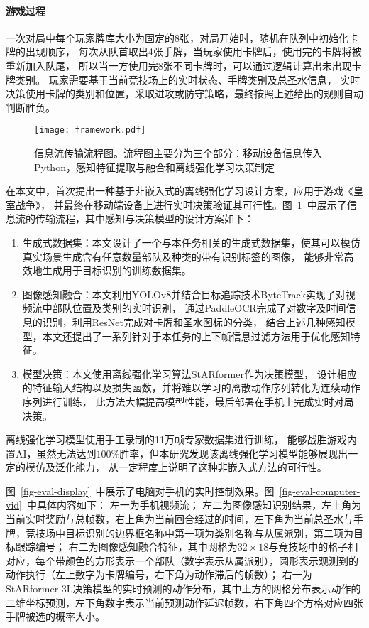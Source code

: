 \paragraph*{游戏过程}一次对局中每个玩家牌库大小为固定的8张，对局开始时，随机在队列中初始化卡牌的出现顺序，
每次从队首取出4张手牌，当玩家使用卡牌后，使用完的卡牌将被重新加入队尾，
所以当一方使用完8张不同卡牌时，可以通过逻辑计算出未出现卡牌类别。
玩家需要基于当前竞技场上的实时状态、手牌类别及总圣水信息，
实时决策使用卡牌的类别和位置，采取进攻或防守策略，最终按照上述给出的规则自动判断胜负。

\begin{figure}[htbp]
  \centering\vspace{-3ex}
  \texttt{[image: framework.pdf]}
  \caption{信息流传输流程图。流程图主要分为三个部分：移动设备信息传入Python，感知特征提取与融合和离线强化学习决策制定}\label{fig-framework}
\end{figure}
在本文中，首次提出一种基于非嵌入式的离线强化学习设计方案，应用于游戏《皇室战争》，
并最终在移动端设备上进行实时决策验证其可行性。图~\ref{fig-framework}~中展示了信息流的传输流程，其中感知与决策模型的设计方案如下：
\begin{enumerate}
  \item 生成式数据集：本文设计了一个与本任务相关的生成式数据集，使其可以模仿真实场景生成含有任意数量部队及种类的带有识别标签的图像，
  能够非常高效地生成用于目标识别的训练数据集。
  \item 图像感知融合：本文利用YOLOv8并结合目标追踪技术ByteTrack实现了对视频流中部队位置及类别的实时识别，
  通过PaddleOCR完成了对数字及时间信息的识别，利用ResNet完成对卡牌和圣水图标的分类，
  结合上述几种感知模型，本文还提出了一系列针对于本任务的上下帧信息过滤方法用于优化感知特征。
  \item 模型决策：本文使用离线强化学习算法StARformer作为决策模型，
  设计相应的特征输入结构以及损失函数，并将难以学习的离散动作序列转化为连续动作序列进行训练，
  此方法大幅提高模型性能，最后部署在手机上完成实时对局决策。
\end{enumerate}

离线强化学习模型使用手工录制的11万帧专家数据集进行训练，
能够战胜游戏内置AI，虽然无法达到$100\%$胜率，但本研究发现该离线强化学习模型能够展现出一定的模仿及泛化能力，
从一定程度上说明了这种非嵌入式方法的可行性。

图~\ref{fig-eval-display}~中展示了电脑对手机的实时控制效果。图~\ref{fig-eval-computer-vid}~中具体内容如下：
左一为手机视频流；
左二为图像感知识别结果，左上角为当前实时奖励与总帧数，右上角为当前回合经过的时间，左下角为当前总圣水与手牌，竞技场中目标识别的边界框名称中第一项为类别名称与从属派别，第二项为目标跟踪编号；
右二为图像感知融合特征，其中网格为$32\times 18$与竞技场中的格子相对应，每个带颜色的方形表示一个部队（数字表示从属派别），圆形表示观测到的动作执行（左上数字为卡牌编号，右下角为动作滞后的帧数）；
右一为StARformer-3L决策模型的实时预测的动作分布，其中上方的网格分布表示动作的二维坐标预测，左下角数字表示当前预测动作延迟帧数，右下角四个方格对应四张手牌被选的概率大小。

